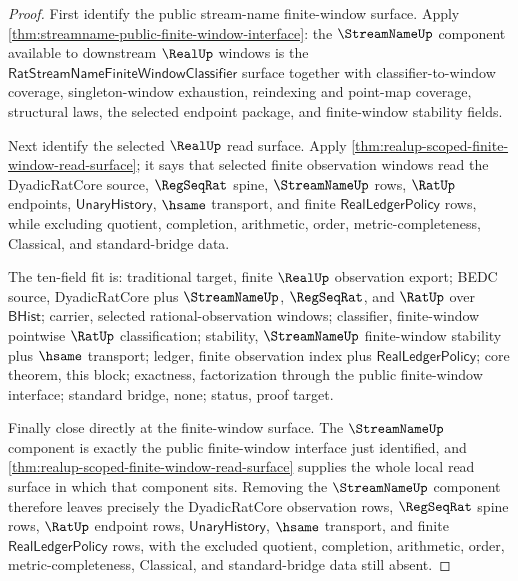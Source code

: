 \begin{proof}
First identify the public stream-name finite-window surface. Apply
\autoref{thm:streamname-public-finite-window-interface}: the
$\StreamNameUp$ component available to downstream $\RealUp$ windows is the
$\mathsf{RatStreamNameFiniteWindowClassifier}$ surface together with
classifier-to-window coverage, singleton-window exhaustion, reindexing and
point-map coverage, structural laws, the selected endpoint package, and
finite-window stability fields.

Next identify the selected $\RealUp$ read surface. Apply
\autoref{thm:realup-scoped-finite-window-read-surface}; it says that selected
finite observation windows read the DyadicRatCore source, $\RegSeqRat$ spine,
$\StreamNameUp$ rows, $\RatUp$ endpoints, $\mathsf{UnaryHistory}$, $\hsame$
transport, and finite $\mathsf{RealLedgerPolicy}$ rows, while excluding quotient,
completion, arithmetic, order, metric-completeness, Classical, and
standard-bridge data.

The ten-field fit is: traditional target, finite $\RealUp$ observation export;
BEDC source, DyadicRatCore plus $\StreamNameUp$, $\RegSeqRat$, and $\RatUp$ over
$\mathsf{BHist}$; carrier, selected rational-observation windows; classifier,
finite-window pointwise $\RatUp$ classification; stability, $\StreamNameUp$
finite-window stability plus $\hsame$ transport; ledger, finite observation
index plus $\mathsf{RealLedgerPolicy}$; core theorem, this block; exactness,
factorization through the public finite-window interface; standard bridge, none;
status, proof target.

	Finally close directly at the finite-window surface. The $\StreamNameUp$
	component is exactly the public finite-window interface just identified, and
	\autoref{thm:realup-scoped-finite-window-read-surface} supplies the whole local
	read surface in which that component sits. Removing the $\StreamNameUp$ component
	therefore leaves precisely the DyadicRatCore observation rows, $\RegSeqRat$
	spine rows, $\RatUp$ endpoint rows, $\mathsf{UnaryHistory}$, $\hsame$ transport,
	and finite $\mathsf{RealLedgerPolicy}$ rows, with the excluded quotient,
	completion, arithmetic, order, metric-completeness, Classical, and
	standard-bridge data still absent.
	\end{proof}

